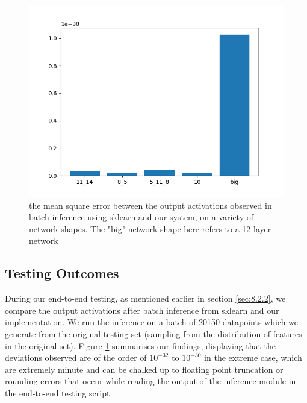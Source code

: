 \documentclass[12pt, titlepage]{article}
\begin{document}
\begin{figure}[H]
	\includegraphics[width=\textwidth]{../images/mse.png}
	\caption{\centering \label{fig:3}the mean square error between the output activations observed in batch inference using sklearn and our system, on a variety of network shapes. The "big" network shape here refers to a 12-layer network}
\end{figure}
\subsection{Testing Outcomes}
During our end-to-end testing, as mentioned earlier in section \ref{sec:8.2.2}, we compare the output activations after batch inference from sklearn and our implementation. We run the inference on a batch of 20150 datapoints which we generate from the original testing set (sampling from the distribution of features in the original set). Figure \ref{fig:3} summarises our findings, displaying that the deviations observed are of the order of $10^{-32}$ to $10^{-30}$ in the extreme case, which are extremely minute and can be chalked up to floating point truncation or rounding errors that occur while reading the output of the inference module in the end-to-end testing script.
\end{document}
